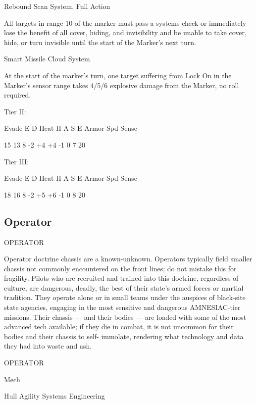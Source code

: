 Rebound Scan  
System, Full Action
 
All targets in range 10 of the marker must pass a systems check or immediately lose the benefit  
of all cover, hiding, and invisibility and be unable to take cover, hide, or turn invisible until the  
start of the Marker’s next turn.
 

Smart Missile Cloud  
System
 
At the start of the marker’s turn, one target suffering from Lock On in the Marker’s sensor range  
takes 4/5/6 explosive damage from the Marker, no roll required.  

Tier II:
 

          Evade     E-D    Heat    H    A     S     E       Armor        Spd       Sense 

          15        13    8        -2   +4    +4    -1      0            7         20 

Tier III:  

          Evade     E-D    Heat    H    A     S     E       Armor        Spd       Sense 

          18        16    8        -2   +5    +6    -1      0            8         20 

                                                                                                                
\subsection{Operator}

                                              OPERATOR  

Operator doctrine chassis are a known-unknown. Operators typically field smaller chassis not  
commonly encountered on the front lines; do not mistake this for fragility. Pilots who are recruited  
and trained into this doctrine, regardless of culture, are dangerous, deadly, the best of their  
state’s armed forces or martial tradition. They operate alone or in small teams under the auspices  
of black-site state agencies, engaging in the most sensitive and dangerous AMNESIAC-tier  
missions. Their chassis — and their bodies — are loaded with some of the most advanced tech  
available; if they die in combat, it is not uncommon for their bodies and their chassis to self- 
immolate, rendering what technology and data they had into waste and ash. 
 

 OPERATOR 

 Mech 

 Hull       Agility      Systems       Engineering 

